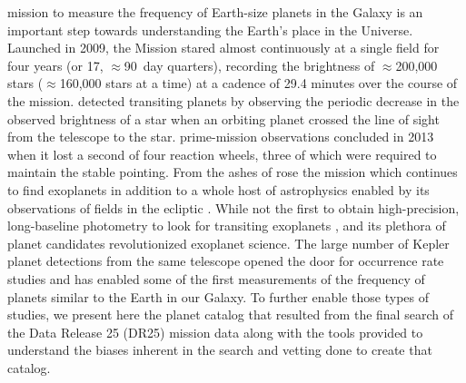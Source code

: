 
 mission to measure the frequency of Earth-size planets in the Galaxy is an important step towards understanding the Earth's place in the Universe.  Launched in 2009, the \Kepler{} Mission \citep{Koch2010,Borucki2016} stared almost continuously at a single field for four years (or 17, $\approx$90~day quarters), recording the brightness of $\approx$200,000 stars ($\approx$160,000 stars at a time) at a cadence of 29.4 minutes over the course of the mission. \Kepler{} detected transiting planets by observing the periodic decrease in the observed brightness of a star when an orbiting planet crossed the line of sight from the telescope to the star.  prime-mission observations concluded in 2013 when it lost a second of four reaction wheels, three of which were required to maintain the stable pointing.  From the ashes of \Kepler{} rose the \Ktwo{} mission which continues to find exoplanets in addition to a whole host of astrophysics enabled by its observations of fields in the ecliptic \citep{Howell2014,VanCleve2016K2}. 
While not the first to obtain high-precision, long-baseline photometry to look for transiting exoplanets \citep[see e.g.,][]{Barge2008,ODonovan2006}, \Kepler{} and its plethora of planet candidates revolutionized exoplanet science. The large number of Kepler planet detections from the same telescope opened the door for occurrence rate studies and has enabled some of the first measurements of the frequency of planets similar to the Earth in our Galaxy.  To further enable those types of studies, we present here the planet catalog that resulted from the final search of the Data Release 25 (DR25) \Kepler{} mission data along with the tools provided to understand the biases inherent in the search and vetting done to create that catalog.

